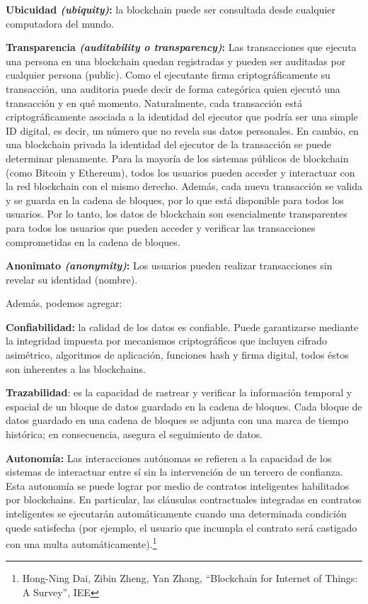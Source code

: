 \documentclass[12pt]{report} %
\begin{document}
\textbf{Ubicuidad \textit{(ubiquity)}:} la blockchain puede ser consultada desde cualquier computadora del mundo.

\textbf{Transparencia \textit{(auditability o transparency)}:} Las transacciones que ejecuta una persona en una blockchain quedan registradas y pueden ser auditadas por cualquier persona (public). Como el ejecutante firma criptográficamente su transacción, una auditoria puede decir de forma categórica quien ejecutó una transacción y en qué momento. Naturalmente, cada transacción está criptográficamente asociada a la identidad del ejecutor que podría ser una simple ID digital, es decir, un número que no revela sus datos personales. En cambio, en una blockchain privada la identidad del ejecutor de la transacción se puede determinar plenamente. Para la mayoría de los sistemas públicos de blockchain (como Bitcoin y Ethereum), todos los usuarios pueden acceder y interactuar con la red blockchain con el mismo derecho. Además, cada nueva transacción se valida y se guarda en la cadena de bloques, por lo que está disponible para todos los usuarios. Por lo tanto, los datos de blockchain son esencialmente transparentes para todos los usuarios que pueden acceder y verificar las transacciones comprometidas en la cadena de bloques.

\textbf{Anonimato \textit{(anonymity)}:} Los usuarios pueden realizar transacciones sin revelar su identidad (nombre).

Además, podemos agregar:

\textbf{Confiabilidad:} la calidad de los datos es confiable. Puede garantizarse mediante la integridad impuesta por mecanismos criptográficos que incluyen cifrado asimétrico, algoritmos de aplicación, funciones hash y firma digital, todos éstos son inherentes a las blockchains.

\textbf{Trazabilidad}: es la capacidad de rastrear y verificar la información temporal y espacial de un bloque de datos guardado en la cadena de bloques. Cada bloque de datos guardado en una cadena de bloques se adjunta con una marca de tiempo histórica; en consecuencia, asegura el seguimiento de datos.

\textbf{Autonomía:} Las interacciones autónomas se refieren a la capacidad de los sistemas de interactuar entre sí sin la intervención de un tercero de confianza. Esta autonomía se puede lograr por medio de contratos inteligentes habilitados por blockchains. En particular, las cláusulas contractuales integradas en contratos inteligentes se ejecutarán automáticamente cuando una determinada condición quede satisfecha (por ejemplo, el usuario que incumpla el contrato será castigado con una multa automáticamente).\footnote{  Hong-Ning Dai, Zibin Zheng, Yan Zhang, “Blockchain for Internet of Things: A Survey”, IEE} 
\end{document}
